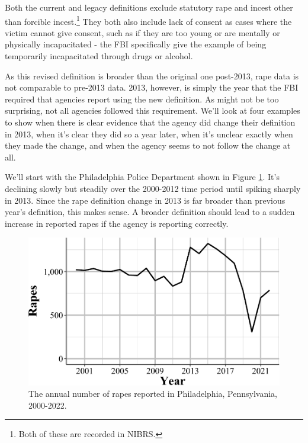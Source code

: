 \documentclass[
  12pt,
  openany]{book}
\begin{document}
Both the current and legacy definitions exclude statutory rape and incest other than forcible incest.\footnote{Both of these are recorded in NIBRS.} They both also include lack of consent as cases where the victim cannot give consent, such as if they are too young or are mentally or physically incapacitated - the FBI specifically give the example of being temporarily incapacitated through drugs or alcohol.

As this revised definition is broader than the original one post-2013, rape data is not comparable to pre-2013 data. 2013, however, is simply the year that the FBI required that agencies report using the new definition. As might not be too surprising, not all agencies followed this requirement. We'll look at four examples to show when there is clear evidence that the agency did change their definition in 2013, when it's clear they did so a year later, when it's unclear exactly when they made the change, and when the agency seems to not follow the change at all.

We'll start with the Philadelphia Police Department shown in Figure \ref{fig:rapePhilly}. It's declining slowly but steadily over the 2000-2012 time period until spiking sharply in 2013. Since the rape definition change in 2013 is far broader than previous year's definition, this makes sense. A broader definition should lead to a sudden increase in reported rapes if the agency is reporting correctly.

\begin{figure}

{\centering \includegraphics[width=0.9\linewidth]{03_offenses_known_files/figure-latex/rapePhilly-1} 

}

\caption{The annual number of rapes reported in Philadelphia, Pennsylvania, 2000-2022.}\label{fig:rapePhilly}
\end{figure}
\end{document}
